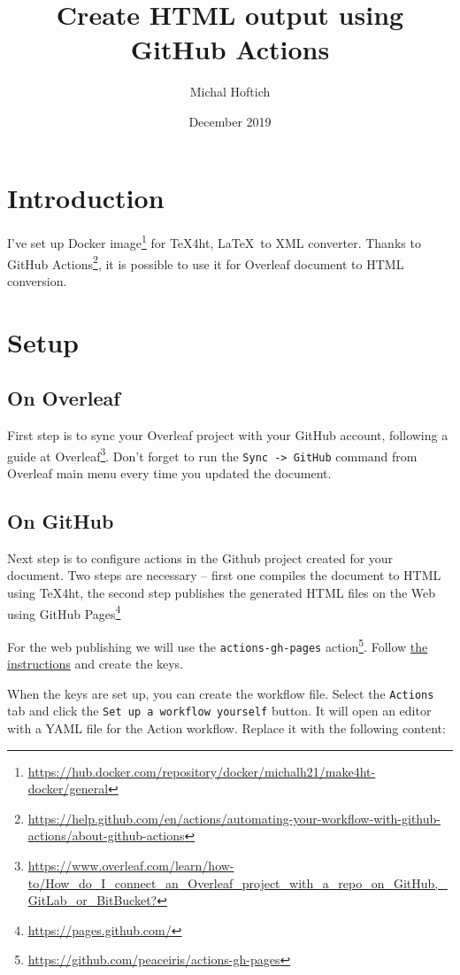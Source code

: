 \documentclass{article}
\title{Create HTML output using GitHub Actions}
\author{Michal Hoftich}
\date{December 2019}
\newcommand{\cmdname}[1]{\texttt{#1}}
\newcommand\footurl[1]{\footnote{\url{#1}}}
\begin{document}
\maketitle

\section{Introduction}

I've set up Docker image\footurl{https://hub.docker.com/repository/docker/michalh21/make4ht-docker/general} for \TeX4ht, \LaTeX\ to XML converter. Thanks to GitHub 
Actions\footurl{https://help.github.com/en/actions/automating-your-workflow-with-github-actions/about-github-actions}, it is possible to use it for Overleaf document to HTML conversion.

\section{Setup}

\subsection{On Overleaf}

First step is to sync your Overleaf project with your GitHub account, following a guide at Overleaf\footurl{https://www.overleaf.com/learn/how-to/How_do_I_connect_an_Overleaf_project_with_a_repo_on_GitHub,_GitLab_or_BitBucket?}. Don't forget to run the \cmdname{Sync -> GitHub} command from Overleaf main menu every time you updated the document.

\subsection{On GitHub}
Next step is to configure actions in the Github project created for your document. Two steps are necessary -- first  one compiles the document to HTML using \TeX4ht, the second step publishes the generated HTML files on the Web using GitHub Pages\footurl{https://pages.github.com/}

For the web publishing we will use the \verb|actions-gh-pages| action\footurl{https://github.com/peaceiris/actions-gh-pages}. Follow \href{https://github.com/peaceiris/actions-gh-pages\#1-add-ssh-deploy-key}{the instructions} and create the keys.

When the keys are set up, you can create the workflow file. Select the \cmdname{Actions} tab and click the \cmdname{Set up a workflow yourself} button. It will open an editor with a YAML file for the Action workflow. Replace it with the following content:
\end{document}
